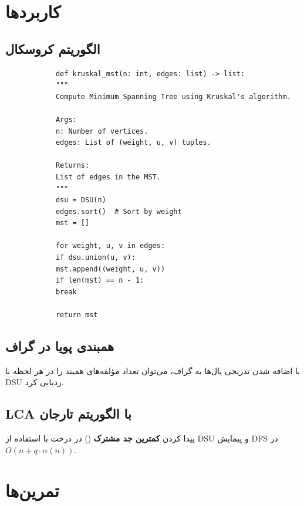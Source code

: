 \documentclass{matinbook}
\begin{document}
    \section{کاربردها}
    
    \subsection{الگوریتم کروسکال}
    
    \begin{latin}
        \begin{verbatim}
            def kruskal_mst(n: int, edges: list) -> list:
            """
            Compute Minimum Spanning Tree using Kruskal's algorithm.
            
            Args:
            n: Number of vertices.
            edges: List of (weight, u, v) tuples.
            
            Returns:
            List of edges in the MST.
            """
            dsu = DSU(n)
            edges.sort()  # Sort by weight
            mst = []
            
            for weight, u, v in edges:
            if dsu.union(u, v):
            mst.append((weight, u, v))
            if len(mst) == n - 1:
            break
            
            return mst
        \end{verbatim}
    \end{latin}
    \label{code:kruskal}
    
    \subsection{همبندی پویا در گراف}
    
    با اضافه شدن تدریجی یال‌ها به گراف،
    می‌توان تعداد مؤلفه‌های همبند را
    در هر لحظه با DSU ردیابی کرد.
    
    \subsection{LCA با الگوریتم تارجان}
    
    پیدا کردن \textbf{کمترین جد مشترک}
    () در درخت
    با استفاده از DSU و پیمایش DFS
    در $O(n + q \cdot \alpha(n))$.
    
    \section{تمرین‌ها}
    
\end{document}
